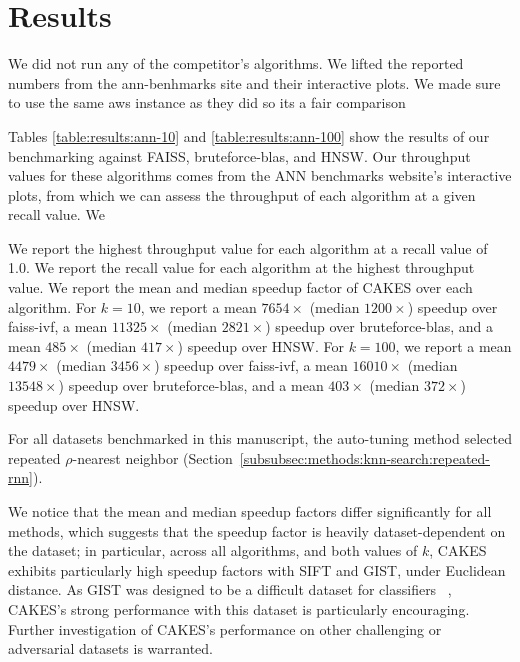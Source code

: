 \section{Results}
\label{sec:results}

We did not run any of the competitor’s algorithms. We lifted the reported numbers from the ann-benhmarks site and their interactive plots. We made sure to use the same aws instance as they did so its a fair comparison


Tables \ref{table:results:ann-10} and \ref{table:results:ann-100} show the results of our benchmarking against FAISS, bruteforce-blas, and HNSW. Our throughput values for these algorithms comes from the ANN benchmarks website's interactive plots, from which we can assess the throughput of each algorithm at a given recall value. We 


We report the highest throughput value for each algorithm at a recall value of 1.0. We report the recall value for each algorithm at the highest throughput value. We report the mean and median speedup factor of CAKES over each algorithm.
For $k= 10$, we report a mean $7654\times$ (median $1200\times$) speedup over faiss-ivf, a mean $11325\times$ (median $2821\times$) speedup over bruteforce-blas, 
and a mean $485\times$ (median $417\times$) speedup over HNSW. 
For $k=100$, we report a mean $4479\times$ (median $3456\times$) speedup over faiss-ivf, a mean $16010\times$ (median $13548\times$) speedup over bruteforce-blas, and a mean $403\times$ (median $372\times$) speedup over HNSW.


For all datasets benchmarked in this manuscript, the auto-tuning method selected repeated $\rho$-nearest neighbor (Section~\ref{subsubsec:methods:knn-search:repeated-rnn}).

We notice that the mean and median speedup factors differ significantly for all methods, which suggests that the speedup factor is heavily dataset-dependent on the dataset; in particular, across all algorithms, and both values of $k$, CAKES exhibits particularly high speedup factors with SIFT and GIST, under Euclidean distance. As GIST was designed to be a difficult dataset for classifiers~\cite{Lee2019PracticalLP} , CAKES's strong performance with this dataset is particularly encouraging. Further investigation of CAKES's performance on other challenging or adversarial datasets is warranted. 

